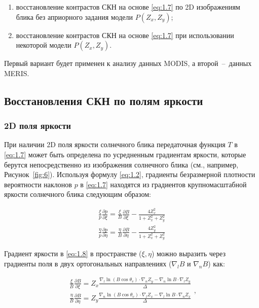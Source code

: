 \begin{enumerate}
	\item восстановление контрастов СКН на основе \eqref{eq:1.7} по 2D изображениям блика без априорного задания модели $P(Z_{x} ,Z_{y} )$;
	\item восстановление контрастов СКН на основе \eqref{eq:1.7} при использовании некоторой модели $P(Z_{x} ,Z_{y} )$.
\end{enumerate}

Первый вариант будет применен к анализу данных MODIS, а второй~--~данных MERIS.



\subsection{Восстановления СКН по полям яркости}



\subsubsection{2D поля яркости} \label{sec:1.3.3}


При наличии 2D поля яркости солнечного блика передаточная функция $T$ в \eqref{eq:1.7} может быть определена по усредненным градиентам яркости, которые берутся непосредственно из изображения солнечного блика (см., например, Рисунок~\ref{fig:6}). Используя формулу \eqref{eq:1.2}, градиенты безразмерной плотности вероятности наклонов $p$ в \eqref{eq:1.7} находятся из градиентов крупномасштабной яркости солнечного блика следующим образом:

\begin{equation} \label{eq:1.8} 
\begin{array}{l} {\frac{\xi }{p} \frac{\partial p}{\partial \xi } =\frac{\xi }{B} \frac{\partial B}{\partial \xi } -\frac{4Z_{x}^{2} }{1+Z_{x}^{2} +Z_{y}^{2} } } \\ {\frac{\eta }{p} \frac{\partial p}{\partial \eta } =\frac{\eta }{B} \frac{\partial B}{\partial \eta } -\frac{4Z_{y}^{2} }{1+Z_{x}^{2} +Z_{y}^{2} } } \end{array} 
\end{equation} 


Градиент яркости в \eqref{eq:1.8} в пространстве ($\xi ,\eta $) можно выразить через градиенты поля в двух ортогональных направлениях ($\nabla _{l} B$ и $\nabla _{n} B$) как:


\begin{equation} \label{eq:1.9} 
\begin{array}{l} {\frac{\xi }{B} \frac{\partial B}{\partial \xi } =Z_{x} \frac{\nabla _{l} \ln (B\cos \theta _{v} )\cdot \nabla _{n} Z_{y}^{} -\nabla _{n} \ln B\cdot \nabla _{l} Z_{y}^{} }{\Delta } } \\ {\frac{\eta }{B} \frac{\partial B}{\partial \eta } =Z_{y} \frac{\nabla _{n} \ln (B\cos \theta _{v} )\cdot \nabla _{l} Z_{x}^{} -\nabla _{l} \ln B\cdot \nabla _{n} Z_{x}^{} }{\Delta } } \end{array},  
\end{equation} 



